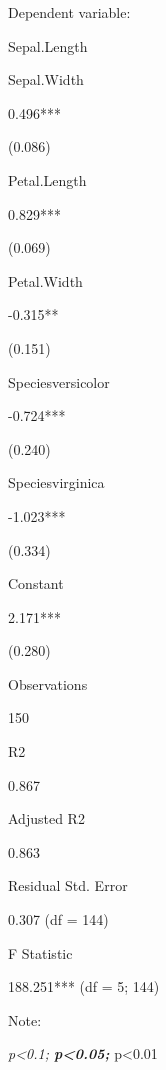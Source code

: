 \documentclass[
]{article}
\begin{document}
Dependent variable:

Sepal.Length

Sepal.Width

0.496***

(0.086)

Petal.Length

0.829***

(0.069)

Petal.Width

-0.315**

(0.151)

Speciesversicolor

-0.724***

(0.240)

Speciesvirginica

-1.023***

(0.334)

Constant

2.171***

(0.280)

Observations

150

R2

0.867

Adjusted R2

0.863

Residual Std. Error

0.307 (df = 144)

F Statistic

188.251*** (df = 5; 144)

Note:

\emph{p\textless0.1; \textbf{p\textless0.05; }}p\textless0.01
\end{document}
